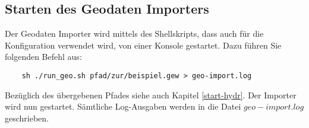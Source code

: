 \subsection{Starten des Geodaten Importers}
\label{Starten des Geodaten Importers}
Der Geodaten Importer wird mittels des Shellskripts,
dass auch für die Konfiguration verwendet wird, von einer Konsole
gestartet. Dazu führen Sie folgenden Befehl aus:\\

\begin{lstlisting}
    sh ./run_geo.sh pfad/zur/beispiel.gew > geo-import.log
\end{lstlisting}

Bezüglich des übergebenen Pfades siehe auch Kapitel \ref{start-hydr}.
Der Importer wird nun gestartet. Sämtliche Log-Ausgaben werden in die Datei
$geo-import.log$ geschrieben.


